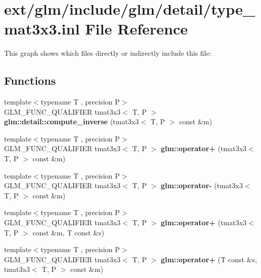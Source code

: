 \hypertarget{type__mat3x3_8inl}{\section{ext/glm/include/glm/detail/type\-\_\-mat3x3.inl File Reference}
\label{type__mat3x3_8inl}
}
This graph shows which files directly or indirectly include this file\-:
\subsection*{Functions}
\begin{DoxyCompactItemize}
\item 
\hypertarget{namespaceglm_1_1detail_a1dd00ec9765b576b81c8b789a93895a6}{{\footnotesize template$<$typename T , precision P$>$ }\\G\-L\-M\-\_\-\-F\-U\-N\-C\-\_\-\-Q\-U\-A\-L\-I\-F\-I\-E\-R tmat3x3$<$ T, P $>$ {\bfseries glm\-::detail\-::compute\-\_\-inverse} (tmat3x3$<$ T, P $>$ const \&m)}\label{namespaceglm_1_1detail_a1dd00ec9765b576b81c8b789a93895a6}

\item 
\hypertarget{namespaceglm_a1a84bec33e1d2b50b7707e1b5dcba723}{{\footnotesize template$<$typename T , precision P$>$ }\\G\-L\-M\-\_\-\-F\-U\-N\-C\-\_\-\-Q\-U\-A\-L\-I\-F\-I\-E\-R tmat3x3$<$ T, P $>$ {\bfseries glm\-::operator+} (tmat3x3$<$ T, P $>$ const \&m)}\label{namespaceglm_a1a84bec33e1d2b50b7707e1b5dcba723}

\item 
\hypertarget{namespaceglm_a0106ce96b46df77919c888f5a454cc40}{{\footnotesize template$<$typename T , precision P$>$ }\\G\-L\-M\-\_\-\-F\-U\-N\-C\-\_\-\-Q\-U\-A\-L\-I\-F\-I\-E\-R tmat3x3$<$ T, P $>$ {\bfseries glm\-::operator-\/} (tmat3x3$<$ T, P $>$ const \&m)}\label{namespaceglm_a0106ce96b46df77919c888f5a454cc40}

\item 
\hypertarget{namespaceglm_ab67a7995bbbd541ccbc3cb8383422093}{{\footnotesize template$<$typename T , precision P$>$ }\\G\-L\-M\-\_\-\-F\-U\-N\-C\-\_\-\-Q\-U\-A\-L\-I\-F\-I\-E\-R tmat3x3$<$ T, P $>$ {\bfseries glm\-::operator+} (tmat3x3$<$ T, P $>$ const \&m, T const \&s)}\label{namespaceglm_ab67a7995bbbd541ccbc3cb8383422093}

\item 
\hypertarget{namespaceglm_a440f3185654f2ff02629dd7325127671}{{\footnotesize template$<$typename T , precision P$>$ }\\G\-L\-M\-\_\-\-F\-U\-N\-C\-\_\-\-Q\-U\-A\-L\-I\-F\-I\-E\-R tmat3x3$<$ T, P $>$ {\bfseries glm\-::operator+} (T const \&s, tmat3x3$<$ T, P $>$ const \&m)}\label{namespaceglm_a440f3185654f2ff02629dd7325127671}


\end{DoxyCompactItemize}
